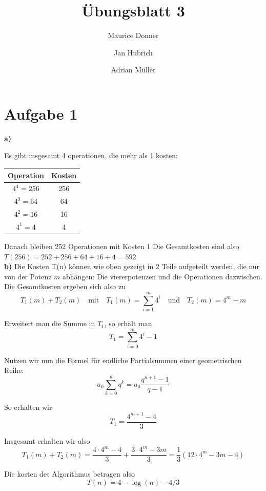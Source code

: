 \documentclass{article}
\title{\textsf{\color{blue!40!black}Übungsblatt 3}}
\author{Maurice Donner \and Jan Hubrich \and Adrian Müller}
\begin{document}
\maketitle
\newpage

\section*{Aufgabe 1} 
\textbf{a)}

    
Es gibt insgesamt 4 operationen, die mehr als 1 kosten:
\begin{table}[H]
    \centering
    \begin{tabular}{cc}
	\toprule
	Operation & Kosten \\ \midrule
	\( 4 ^{4} = 256 \) & 256 \\
	\( 4 ^{3} = 64 \) & 64 \\
	\( 4 ^{2} = 16 \) & 16 \\ 
	\( 4 ^{1} = 4 \) & 4\\
	\bottomrule
    \end{tabular}
\end{table}
   Danach bleiben 252 Operationen mit Kosten 1 
   Die Gesamtkosten sind also 
\( T(256) = 252 + 256 + 64 + 16 + 4 = 592 \)\\

\textbf{b)} 
Die Kosten T(n) können wie oben gezeigt in 2 Teile aufgeteilt werden, die nur
von der Potenz \( m \) abhängen:
Die viererpotenzen und die Operationen dazwischen.\\

Die Gesamtkosten ergeben sich also zu
\[ 
    T _{1}(m) + T _{2}(m) \quad \text{mit} \quad
    T _{1}(m) = \sum_{i=1} ^{m} 4 ^{i} \quad \text{und} \quad T _{2} (m) = 4 ^{m} - m
\]

Erweitert man die Summe in \( T _{1} \), so erhält man
\[ 
    T_1 = \sum_{i=0} ^{m} 4 ^{i} - 1 
\]

Nutzen wir nun die Formel für endliche Partialsummen einer geometrischen Reihe:
\[ 
    a _{0} \sum_{k=0} ^{n} q ^{k} = a _{0} \frac{q ^{n+1} -1}{q-1}
\]

So erhalten wir
\[ 
    T_1 = \frac{4 ^{m+1} - 4 }{3}
\]

Insgesamt erhalten wir also
\[ 
    T _{1} (m) + T _{2} (m) =
    \frac{4 \cdot 4 ^{m} -4}{3} + \frac{3 \cdot 4 ^{m} - 3 m }{3} =
    \frac{1}{3} \left(12 \cdot 4 ^{m} - 3m - 4\right) 
\]

Die kosten des Algorithmus betragen also
\[ 
    T(n) = 4 - \log \left( n \right) - 4/3
\]
\end{document}
